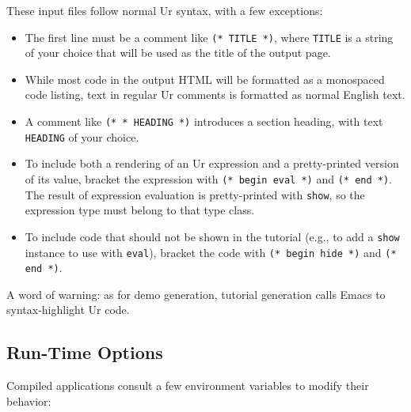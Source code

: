 \documentclass{article}
\newcommand{\cd}[1]{\texttt{#1}}
\begin{document}
These input files follow normal Ur syntax, with a few exceptions:
\begin{itemize}
\item The first line must be a comment like \cd{(* TITLE *)}, where \cd{TITLE} is a string of your choice that will be used as the title of the output page.
\item While most code in the output HTML will be formatted as a monospaced code listing, text in regular Ur comments is formatted as normal English text.
\item A comment like \cd{(* * HEADING *)} introduces a section heading, with text \cd{HEADING} of your choice.
\item To include both a rendering of an Ur expression and a pretty-printed version of its value, bracket the expression with \cd{(* begin eval *)} and \cd{(* end *)}.  The result of expression evaluation is pretty-printed with \cd{show}, so the expression type must belong to that type class.
\item To include code that should not be shown in the tutorial (e.g., to add a \cd{show} instance to use with \cd{eval}), bracket the code with \cd{(* begin hide *)} and \cd{(* end *)}.
\end{itemize}

A word of warning: as for demo generation, tutorial generation calls Emacs to syntax-highlight Ur code.

\subsection{Run-Time Options}

Compiled applications consult a few environment variables to modify their behavior:
\end{document}
